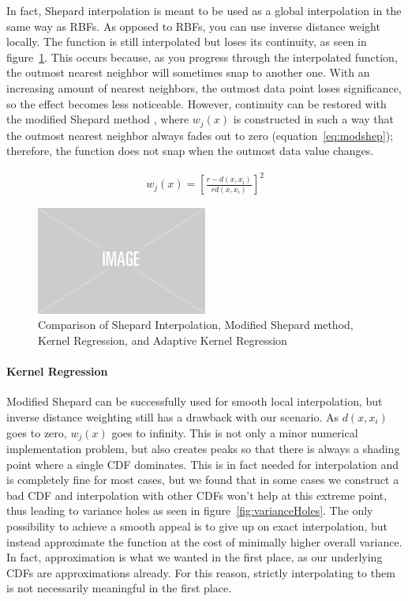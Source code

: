 In fact, Shepard interpolation is meant to be used as a global interpolation in the same way as RBFs.  As opposed to RBFs, you can use inverse distance weight locally. The function is still interpolated but loses its continuity, as seen in figure~\ref{fig:shepmodshepkradkreg}. This occurs because, as you progress through the interpolated function, the outmost nearest neighbor will sometimes snap to another one. With an increasing amount of nearest neighbors, the outmost data point loses significance, so the effect becomes less noticeable. However, continuity can be restored with the modified Shepard method \parencite{franke1980smooth, DBLP:conf/siggraph/AnjyoLP14}, where $w_j(x)$ is constructed in such a way that the outmost nearest neighbor always fades out to zero (equation~\ref{eq:modshep}); therefore, the function does not snap when the outmost data value changes.

\begin{align}\label{eq:modshep}
w_j(x) = \left[ \frac{ r - d(x, x_i)}{ rd(x, x_i) } \right]^2
\end{align}

\begin{figure}
    \centering
    \includegraphics[width=0.5\textwidth]{figures/img-placeholder.png}
    \caption{Comparison of Shepard Interpolation, Modified Shepard method, Kernel Regression, and Adaptive Kernel Regression}
    \label{fig:shepmodshepkradkreg}
\end{figure}


\paragraph{Kernel Regression}

Modified Shepard can be successfully used for smooth local interpolation, but inverse distance weighting still has a drawback with our scenario. As $d(x, x_i)$ goes to zero, $w_j(x)$ goes to infinity. This is not only a minor numerical implementation problem, but also creates peaks so that there is always a shading point where a single CDF dominates. This is in fact needed for interpolation and is completely fine for most cases, but we found that in some cases we construct a bad CDF and interpolation with other CDFs won't help at this extreme point, thus leading to variance holes as seen in figure~\ref{fig:varianceHoles}. The only possibility to achieve a smooth appeal is to give up on exact interpolation, but instead approximate the function at the cost of minimally higher overall variance. In fact, approximation is what we wanted in the first place, as our underlying CDFs are approximations already. For this reason, strictly interpolating to them is not necessarily meaningful in the first place.

